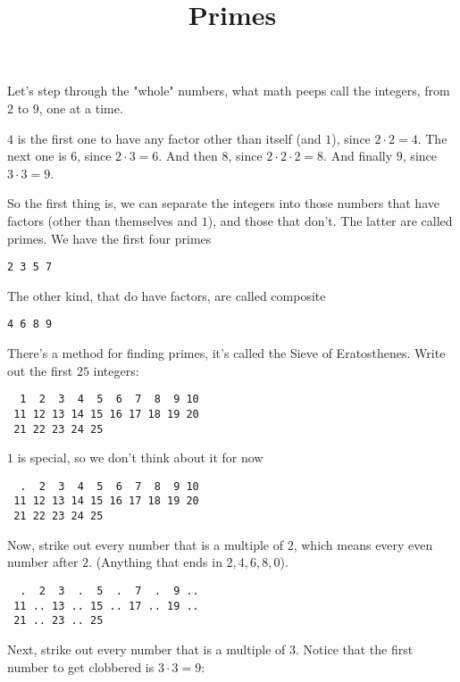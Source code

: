 \documentclass[11pt, oneside]{article}
\title{Primes}
\date{}
\begin{document}
\maketitle
\Large


Let's step through the "whole" numbers, what math peeps call the integers, from $2$ to $9$, one at a time. 

$4$ is the first one to have any factor other than itself (and $1$), since $2 \cdot 2 = 4$.  The next one is $6$, since $2 \cdot 3 = 6$.  And then $8$, since $2 \cdot 2 \cdot 2 = 8$.  And finally $9$, since $3 \cdot 3 = 9$.

So the first thing is, we can separate the integers into those numbers that have factors (other than themselves and $1$), and those that don't.  The latter are called primes.  We have the first four primes

\begin{verbatim} 
2 3 5 7 
\end{verbatim}

The other kind, that do have factors, are called composite

\begin{verbatim}
4 6 8 9
\end{verbatim}

There's a method for finding primes, it's called the Sieve of Eratosthenes.  Write out the first $25$ integers:

\begin{verbatim}
  1  2  3  4  5  6  7  8  9 10
 11 12 13 14 15 16 17 18 19 20
 21 22 23 24 25
 \end{verbatim}

$1$ is special, so we don't think about it for now

\begin{verbatim}
  .  2  3  4  5  6  7  8  9 10
 11 12 13 14 15 16 17 18 19 20
 21 22 23 24 25
 \end{verbatim}

Now, strike out every number that is a multiple of $2$, which means every even number after $2$.  (Anything that ends in $2,4,6,8,0$).

\begin{verbatim}
  .  2  3  .  5  .  7  .  9 ..
 11 .. 13 .. 15 .. 17 .. 19 ..
 21 .. 23 .. 25
 \end{verbatim}

Next, strike out every number that is a multiple of $3$.  Notice that the first number to get clobbered is $3 \cdot 3 = 9$:
\end{document}
